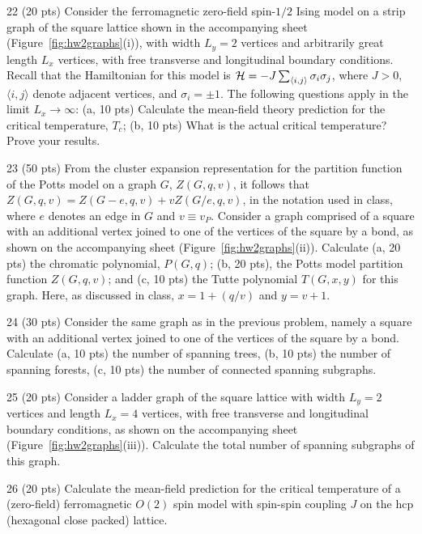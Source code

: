 \begin{hwproblem}{2}{2}
(20 pts) Consider the ferromagnetic zero-field spin-$1/2$ Ising model on a strip graph of the square lattice shown in
the accompanying sheet (Figure~\ref{fig:hw2graphs}(i)), with width $L_y = 2$ vertices and arbitrarily great length
$L_x$ vertices, with free transverse and longitudinal boundary conditions. Recall that the Hamiltonian for this model
is $\mathcal{H} = -J\sum_{\langle i,j\rangle}\sigma_i\sigma_j$, where $J>0$, $\langle i,j\rangle$ denote adjacent vertices, and
$\sigma_i = \pm1$. The following questions apply in the limit $L_x\to\infty$: (a, 10 pts) Calculate the mean-field
theory prediction for the critical temperature, $T_c$; (b, 10 pts) What is the actual critical temperature? Prove your
results.
\end{hwproblem}

\begin{hwproblem}{2}{3}
(50 pts) From the cluster expansion representation for the partition function of the Potts model on a graph $G$,
$Z(G,q,v)$, it follows that $Z(G,q,v) = Z(G-e,q,v)+vZ(G/e,q,v)$, in the notation used in class, where $e$ denotes an
edge in $G$ and $v\equiv v_P$. Consider a graph comprised of a square with an additional vertex joined to one of the
vertices of the square by a bond, as shown on the accompanying sheet (Figure~\ref{fig:hw2graphs}(ii)). Calculate (a, 20
pts) the chromatic polynomial, $P(G,q)$; (b, 20 pts), the Potts model partition function $Z(G,q,v)$; and (c, 10 pts)
the Tutte polynomial $T(G,x,y)$ for this graph. Here, as discussed in class, $x = 1+(q/v)$ and $y = v+1$.
\end{hwproblem}

\begin{hwproblem}{2}{4}
(30 pts) Consider the same graph as in the previous problem, namely a square with an additional vertex joined to one
of the vertices of the square by a bond. Calculate (a, 10 pts) the number of spanning trees, (b, 10 pts) the number of
spanning forests, (c, 10 pts) the number of connected spanning subgraphs.
\end{hwproblem}

\begin{hwproblem}{2}{5}
(20 pts) Consider a ladder graph of the square lattice with width $L_y = 2$ vertices and length $L_x = 4$ vertices,
with free transverse and longitudinal boundary conditions, as shown on the accompanying sheet
(Figure~\ref{fig:hw2graphs}(iii)). Calculate the total number of spanning subgraphs of this graph.
\end{hwproblem}

\begin{hwproblem}{2}{6}
(20 pts) Calculate the mean-field prediction for the critical temperature of a (zero-field) ferromagnetic $O(2)$ spin
model with spin-spin coupling $J$ on the hcp (hexagonal close packed) lattice.
\end{hwproblem}
